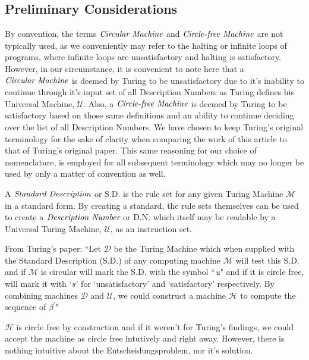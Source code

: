 \documentclass[11pt]{article}
\begin{document}

\subsection{Preliminary Considerations}
By convention, the terms $\emph{Circular Machine}$ and $\emph{Circle-free Machine}$ are not typically used, as we conveniently may refer to the halting or infinite loops of programs, where infinite loops are unsatisfactory and halting is satisfactory. However, in our circumstance, it is convenient to note here that a $\emph{Circular Machine}$ is deemed by Turing to be unsatisfactory due to it's inability to continue through it's input set of all Description Numbers as Turing defines his Universal Machine, $\mathscr{U}$. Also, a $\emph{Circle-free Machine}$ is deemed by Turing to be satisfactory based on those same definitions and an ability to continue deciding over the list of all Description Numbers. We have chosen to keep Turing's original terminology for the sake of clarity when comparing the work of this article to that of Turing's original paper. This same reasoning for our choice of nomenclature, is employed for all subsequent terminology which may no longer be used by only a matter of convention as well. \cite{Turing}

A $\emph{Standard Description}$ or S.D. is the rule set for any given Turing Machine $\mathscr{M}$ in a standard form. By creating a standard, the rule sets themselves can be used to create a $\emph{Description Number}$ or D.N. which itself may be readable by a Universal Turing Machine, $\mathscr{U}$, as an instruction set. \cite{Turing}

From Turing's paper: ``Let $\mathscr{D}$ be the Turing Machine which when supplied with the Standard Description (S.D.) of any computing machine $\mathscr{M}$ will test this S.D. and if $\mathscr{M}$ is circular will mark the S.D. with the symbol ``$\emph{u}$" and if it is circle free, will mark it with `$\emph{s}$' for `unsatisfactory' and `satisfactory' respectively. By combining machines $\mathscr{D}$ and $\mathscr{U}$, we could construct a machine $\mathscr{H}$ to compute the sequence of $\beta^{'}$" \cite{Turing}

$\mathscr{H}$ is circle free by construction and if it weren't for Turing's findings, we could accept the machine as circle free intutively and right away. However, there is nothing intuitive about the Entscheidungsproblem, nor it's solution. \cite{Turing}
\end{document}
